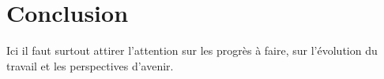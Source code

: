 \chapter*{Conclusion}

Ici il faut surtout attirer l'attention sur les progrès à faire, sur l'évolution du travail et les perspectives d'avenir.
